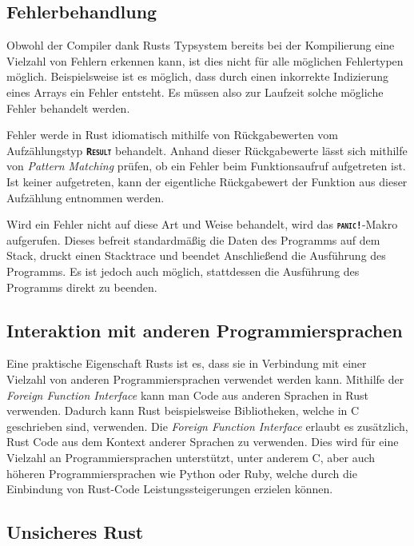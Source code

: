 \subsection{Fehlerbehandlung}\label{sec:error_handling}

Obwohl der Compiler dank Rusts Typsystem bereits bei der Kompilierung eine Vielzahl von Fehlern erkennen kann,
ist dies  nicht für alle möglichen Fehlertypen möglich. Beispielsweise ist es möglich, dass
durch einen inkorrekte Indizierung eines Arrays ein Fehler entsteht.
Es müssen also zur Laufzeit solche mögliche Fehler behandelt werden.\cite{rustBook}

Fehler werde in Rust idiomatisch mithilfe von Rückgabewerten vom Aufzählungstyp \texttt{\textsc{\textbf{Result}}}
behandelt. Anhand dieser Rückgabewerte lässt sich mithilfe von
\textit{Pattern Matching} prüfen, ob ein Fehler beim Funktionsaufruf aufgetreten ist. Ist keiner aufgetreten,
kann der eigentliche Rückgabewert der Funktion aus dieser Aufzählung entnommen werden.
\cite{rustBook}

Wird ein Fehler nicht auf diese Art und Weise behandelt, wird das \texttt{\textsc{\textbf{panic!}}}-Makro
aufgerufen. Dieses befreit standardmäßig die Daten des Programms auf dem Stack, druckt einen Stacktrace und
beendet Anschließend die Ausführung des Programms. Es ist jedoch auch möglich, stattdessen die Ausführung des
Programms direkt zu beenden.\cite{rustBook}

\subsection{Interaktion mit anderen Programmiersprachen}

Eine praktische Eigenschaft Rusts ist es, dass sie in Verbindung mit einer Vielzahl von anderen Programmiersprachen
verwendet werden kann. Mithilfe der \textit{Foreign Function Interface} kann man Code aus anderen
Sprachen in Rust verwenden. Dadurch kann Rust beispielsweise Bibliotheken, welche in C geschrieben sind, verwenden.
Die \textit{Foreign Function Interface} erlaubt es zusätzlich, Rust Code aus dem Kontext anderer Sprachen zu
verwenden. Dies wird für eine Vielzahl an Programmiersprachen unterstützt, unter anderem C, aber auch höheren
Programmiersprachen wie Python oder Ruby, welche durch die Einbindung von Rust-Code Leistungssteigerungen erzielen können.\cite{firstRustBook}\cite{rustBook-1.2.0}

\subsection{Unsicheres Rust}

